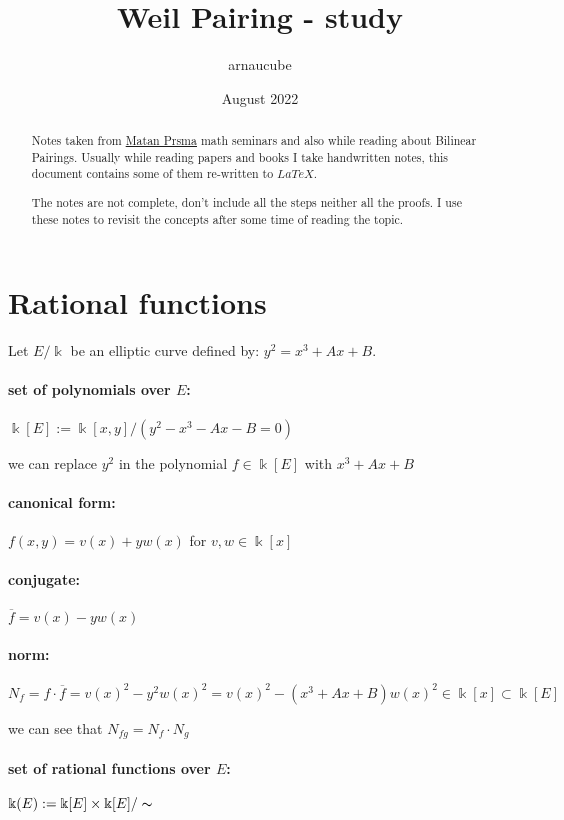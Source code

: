 \documentclass{article}
\title{Weil Pairing - study}
\author{arnaucube}
\date{August 2022}
\theoremstyle{definition}
\begin{document}
\maketitle

\begin{abstract}
  Notes taken from \href{https://sites.google.com/site/matanprasma/artifact}{Matan Prsma} math seminars and also while reading about Bilinear Pairings. Usually while reading papers and books I take handwritten notes, this document contains some of them re-written to $LaTeX$.

	The notes are not complete, don't include all the steps neither all the proofs. I use these notes to revisit the concepts after some time of reading the topic.
\end{abstract}

\tableofcontents

\section{Rational functions}

Let $E/\Bbbk$ be an elliptic curve defined by: $y^2 = x^3 + Ax + B$.

\paragraph{set of polynomials over $E$:}
$\Bbbk[E] := \Bbbk[x,y] / (y^2 - x^3 - Ax - B =0)$

we can replace $y^2$ in the polynomial $f \in \Bbbk[E]$ with $x^3 + Ax + B$

\paragraph{canonical form:} $f(x,y) = v(x)+y w(x)$ for $v, w \in \Bbbk[x]$
\paragraph{conjugate:} $\overline{f} = v(x) - y w(x)$
\paragraph{norm:} $N_f = f \cdot \overline{f} = v(x)^2 - y^2 w(x)^2 = v(x)^2 - (x^3 + Ax + B) w(x)^2 \in \Bbbk[x] \subset \Bbbk[E]$

we can see that $N_{fg} = N_f \cdot N_g$

\paragraph{set of rational functions over $E$:}
$\Bbbk(E) := \Bbbk[E] \times \Bbbk[E]/ \thicksim$
\end{document}
